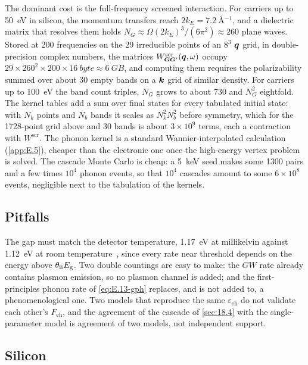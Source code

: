 The dominant cost is the full-frequency screened interaction. For carriers up to \SI{50}{eV} in silicon, the momentum transfers reach $2k_E = \SI{7.2}{\angstrom^{-1}}$, and a dielectric matrix that resolves them holds $N_G \approx \Omega(2k_E)^3/(6\pi^2) \approx 260$ plane waves. Stored at 200 frequencies on the 29 irreducible points of an $8^3$ $\bm{q}$ grid, in double-precision complex numbers, the matrices $W^{\mathrm{scr}}_{\bm{G}\bm{G}'}(\bm{q}, \omega)$ occupy $29\times260^2\times200\times\SI{16}{byte} \approx \SI{6}{GB}$, and computing them requires the polarizability summed over about 30 empty bands on a $\bm{k}$ grid of similar density. For carriers up to \SI{100}{eV} the band count triples, $N_G$ grows to about 730 and $N_G^2$ eightfold. The kernel tables add a sum over final states for every tabulated initial state: with $N_k$ points and $N_b$ bands it scales as $N_k^2N_b^2$ before symmetry, which for the 1728-point grid above and 30 bands is about $3\times10^9$ terms, each a contraction with $W^{\mathrm{scr}}$. The phonon kernel is a standard Wannier-interpolated calculation (\cref{app:E.5}), cheaper than the electronic one once the high-energy vertex problem is solved. The cascade Monte Carlo is cheap: a \SI{5}{keV} seed makes some 1300 pairs and a few times $10^4$ phonon events, so that $10^4$ cascades amount to some $6\times10^8$ events, negligible next to the tabulation of the kernels.

\subsection{Pitfalls}

The gap must match the detector temperature, \SI{1.17}{eV} at millikelvin against \SI{1.12}{eV} at room temperature~\cite[Table~I]{ramanathan2020ionization}, since every rate near threshold depends on the energy above $\theta_{\mathrm{ii}}E_{\mathrm{g}}$. Two double countings are easy to make: the $GW$ rate already contains plasmon emission, so no plasmon channel is added; and the first-principles phonon rate of \cref{eq:E.13-gph} replaces, and is not added to, a phenomenological one. Two models that reproduce the same $\varepsilon_{\mathrm{eh}}$ do not validate each other's $F_{\mathrm{eh}}$, and the agreement of the cascade of \cref{sec:18.4} with the single-parameter model is agreement of two models, not independent support.

\subsection{Silicon}

